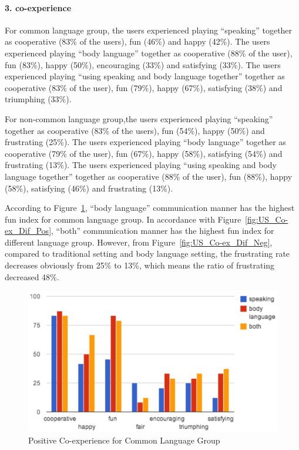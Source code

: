 \paragraph{3. co-experience}

For common language group, the users experienced playing ``speaking'' together as cooperative (83\% of the users), fun (46\%) and happy (42\%). The users experienced playing ``body language'' together as cooperative (88\% of the user), fun (83\%), happy (50\%), encouraging (33\%) and satisfying (33\%). The users experienced playing ``using speaking and body language together'' together as cooperative (83\% of the user), fun (79\%), happy (67\%), satisfying (38\%) and triumphing (33\%).

For non-common language group,the users experienced playing ``speaking'' together as cooperative (83\% of the users), fun (54\%), happy (50\%) and frustrating (25\%). The users experienced playing ``body language'' together as cooperative (79\% of the user), fun (67\%), happy (58\%), satisfying (54\%) and frustrating (13\%). The users experienced playing ``using speaking and body language together'' together as cooperative (88\% of the user), fun (88\%), happy (58\%), satisfying (46\%) and frustrating (13\%). 


According to Figure~\ref{fig:US_Co-ex_Com_Pos}, ``body language'' communication manner has the highest fun index for common language group. In accordance with Figure~\ref{fig:US_Co-ex_Dif_Pos}, ``both'' communication manner has the highest fun index for different language group. However, from Figure~\ref{fig:US_Co-ex_Dif_Neg}, compared to traditional setting and body language setting, the frustrating rate decreases obviously from 25\% to 13\%, which means the ratio of frustrating decreased 48\%.


\begin{figure}[!h]
\centering
\includegraphics[width=0.9\columnwidth]{Figures/US_Co-ex_Com_Pos.png}
\caption{Positive Co-experience for Common Language Group}
\label{fig:US_Co-ex_Com_Pos}
\end{figure}

